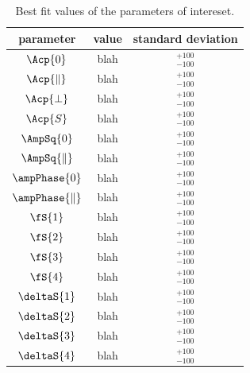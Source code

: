 \begin{table}[!h]
  \center
  \caption{\small Best fit values of the parameters of intereset.}
  \begin{tabular}{c c c}
    \hline
     parameter & value & standard deviation  \\
    \hline
    $\Acp{0}$             & blah & ${}^{+100}_{-100}$ \\
    $\Acp{\parallel}$     & blah & ${}^{+100}_{-100}$ \\
    $\Acp{\perp}$         & blah & ${}^{+100}_{-100}$ \\
    $\Acp{S}$             & blah & ${}^{+100}_{-100}$ \\
    \hline
    $\AmpSq{0}$            & blah & ${}^{+100}_{-100}$ \\
    $\AmpSq{\parallel}$    & blah & ${}^{+100}_{-100}$ \\
    $\ampPhase{0}$         & blah & ${}^{+100}_{-100}$ \\
    $\ampPhase{\parallel}$ & blah & ${}^{+100}_{-100}$ \\
    \hline
    $\fS{1}$               & blah & ${}^{+100}_{-100}$ \\
    $\fS{2}$               & blah & ${}^{+100}_{-100}$ \\
    $\fS{3}$               & blah & ${}^{+100}_{-100}$ \\
    $\fS{4}$               & blah & ${}^{+100}_{-100}$ \\
    \hline
    $\deltaS{1}$           & blah & ${}^{+100}_{-100}$ \\
    $\deltaS{2}$           & blah & ${}^{+100}_{-100}$ \\
    $\deltaS{3}$           & blah & ${}^{+100}_{-100}$ \\
    $\deltaS{4}$           & blah & ${}^{+100}_{-100}$ \\
    \hline
  \end{tabular}
  \label{bestFitResult}
\end{table}

